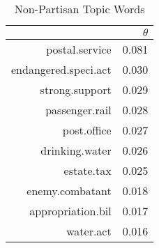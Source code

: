 \begin{table}[ht]
\centering
\begin{tabular}{rr}
  \hline
 & $\theta$ \\ 
  \hline
postal.service & 0.081 \\ 
  endangered.speci.act & 0.030 \\ 
  strong.support & 0.029 \\ 
  passenger.rail & 0.028 \\ 
  post.office & 0.027 \\ 
  drinking.water & 0.026 \\ 
  estate.tax & 0.025 \\ 
  enemy.combatant & 0.018 \\ 
  appropriation.bil & 0.017 \\ 
  water.act & 0.016 \\ 
   \hline
\end{tabular}
\caption{Non-Partisan Topic Words} 
\label{tab:non_part_topics}
\end{table}
